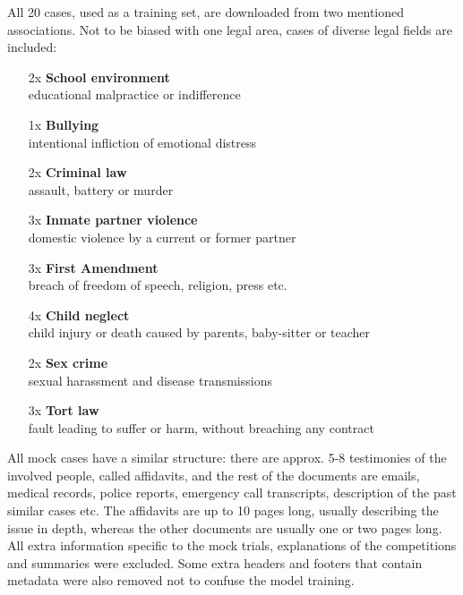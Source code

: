 \documentclass[
  digital, %
  notable,   %
  nolof,     %
  nolot,     %
  draft
]{fithesis3}
\begin{document}
All 20 cases, used as a training set, are downloaded from two mentioned associations.
Not to be biased with one legal area, cases of diverse legal fields are included:
\begin{itemize}
\itemsep0em
\item[2x] \textbf{School environment} \\ educational malpractice or indifference
\item[1x] \textbf{Bullying} \\ intentional infliction of emotional distress
\item[2x] \textbf{Criminal law} \\ assault, battery or murder
\item[3x] \textbf{Inmate partner violence} \\ domestic violence by a current or former partner
\item[3x] \textbf{First Amendment} \\ breach of freedom of speech, religion, press etc.
\item[4x] \textbf{Child neglect} \\ child injury or death caused by parents, baby-sitter or teacher
\item[2x] \textbf{Sex crime} \\ sexual harassment and disease transmissions
\item[3x] \textbf{Tort law } \\ fault leading to suffer or harm, without breaching any contract
\end{itemize}
All mock cases have a similar structure: there are approx. 5-8 testimonies of the involved people, called affidavits, and the rest of the documents are emails, medical records, police reports, emergency call transcripts, description of the past similar cases etc.
The affidavits are up to 10 pages long, usually describing the issue in depth, whereas the other documents are usually one or two pages long.
All extra information specific to the mock trials, explanations of the competitions and summaries were excluded.
Some extra headers and footers that contain metadata were also removed not to confuse the model training.
\end{document}
